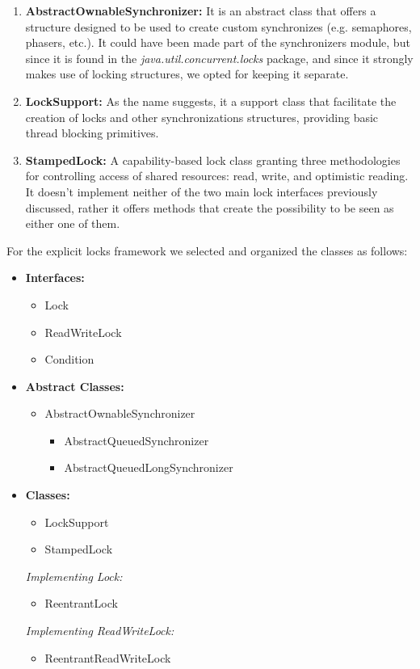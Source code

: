 \documentclass[]{usiinfthesis}
\begin{document}
\begin{enumerate}
    \item \textbf{AbstractOwnableSynchronizer:} It is an abstract class that offers a structure designed to be used to create custom synchronizes (e.g. semaphores, phasers, etc.). It could have been made part of the synchronizers module, but since it is found in the \newline \textit{java.util.concurrent.locks} package, and since it strongly makes use of locking structures, we opted for keeping it separate. 
    \item \textbf{LockSupport:} As the name suggests, it a support class that facilitate the creation of locks and other synchronizations structures, providing basic thread blocking primitives. 
    \item \textbf{StampedLock:} A capability-based lock class granting three methodologies for controlling access of shared resources: read, write, and optimistic reading. It doesn't implement neither of the two main lock interfaces previously discussed, rather it offers methods that create the possibility to be seen as either one of them.
\end{enumerate}

\noindent
For the explicit locks framework we selected and organized the classes as follows:

\begin{itemize}
    \item \textbf{Interfaces:}
    \begin{itemize}
        \item Lock
        \item ReadWriteLock
        \item Condition
    \end{itemize}
    \item \textbf{Abstract Classes:}
    \begin{itemize}
        \item AbstractOwnableSynchronizer
        \begin{itemize}
            \item AbstractQueuedSynchronizer
            \item AbstractQueuedLongSynchronizer
        \end{itemize}
    \end{itemize}
    \item \textbf{Classes:}
    \begin{itemize}    
        \item LockSupport
        \item StampedLock
    \end{itemize}
    \textit{Implementing Lock:}
    \begin{itemize}
        \item ReentrantLock
    \end{itemize}
    \textit{Implementing ReadWriteLock:}
    \begin{itemize}
        \item ReentrantReadWriteLock
    \end{itemize}
\end{itemize}
\end{document}
